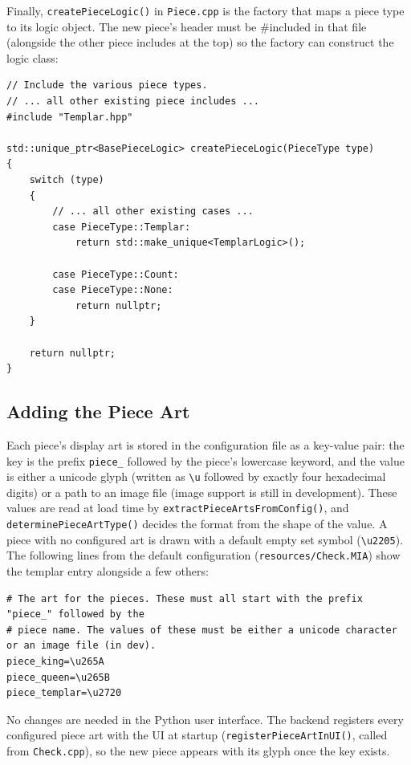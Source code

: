Finally, \texttt{createPieceLogic()} in \texttt{Piece.cpp} is the factory that maps a piece type to its logic object. The new piece's header must be \#included in that file (alongside the other piece includes at the top) so the factory can construct the logic class:

\begin{lstlisting}[style=cppstyle]
// Include the various piece types.
// ... all other existing piece includes ...
#include "Templar.hpp"

std::unique_ptr<BasePieceLogic> createPieceLogic(PieceType type)
{
    switch (type)
    {
        // ... all other existing cases ...
        case PieceType::Templar:
            return std::make_unique<TemplarLogic>();

        case PieceType::Count:
        case PieceType::None:
            return nullptr;
    }

    return nullptr;
}
\end{lstlisting}


\subsection{Adding the Piece Art}\label{section:check_adding_piece_art}

Each piece's display art is stored in the configuration file as a key-value pair: the key is the prefix \texttt{piece\_} followed by the piece's lowercase keyword, and the value is either a unicode glyph (written as \texttt{\textbackslash u} followed by exactly four hexadecimal digits) or a path to an image file (image support is still in development). These values are read at load time by \texttt{extractPieceArtsFromConfig()}, and \texttt{determinePieceArtType()} decides the format from the shape of the value. A piece with no configured art is drawn with a default empty set symbol (\texttt{\textbackslash u2205}). The following lines from the default configuration (\texttt{resources/Check.MIA}) show the templar entry alongside a few others:

\begin{lstlisting}[style=pythonstyle]
# The art for the pieces. These must all start with the prefix "piece_" followed by the
# piece name. The values of these must be either a unicode character or an image file (in dev).
piece_king=\u265A
piece_queen=\u265B
piece_templar=\u2720
\end{lstlisting}

No changes are needed in the Python user interface. The backend registers every configured piece art with the UI at startup (\texttt{registerPieceArtInUI()}, called from \texttt{Check.cpp}), so the new piece appears with its glyph once the key exists.


